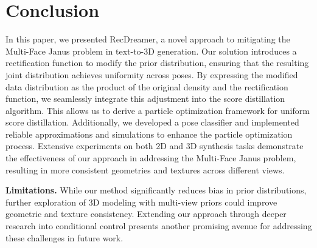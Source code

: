 \vspace{-2mm}
\section{Conclusion}\label{sec:conclusion}
In this paper, we presented RecDreamer, a novel approach to mitigating the Multi-Face Janus problem in text-to-3D generation. Our solution introduces a rectification function to modify the prior distribution, ensuring that the resulting joint distribution achieves uniformity across poses. By expressing the modified data distribution as the product of the original density and the rectification function, we seamlessly integrate this adjustment into the score distillation algorithm. This allows us to derive a particle optimization framework for uniform score distillation. Additionally, we developed a pose classifier and implemented reliable approximations and simulations to enhance the particle optimization process. Extensive experiments on both 2D and 3D synthesis tasks demonstrate the effectiveness of our approach in addressing the Multi-Face Janus problem, resulting in more consistent geometries and textures across different views.

\textbf{Limitations.} While our method significantly reduces bias in prior distributions, further exploration of 3D modeling with multi-view priors could improve geometric and texture consistency. Extending our approach through deeper research into conditional control presents another promising avenue for addressing these challenges in future work. 